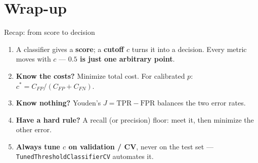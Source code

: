 \documentclass[aspectratio=169]{beamer}
\begin{document}
\section{Wrap-up}

\begin{frame}{Recap: from score to decision}
  \begin{enumerate}\small
    \item A classifier gives a \textbf{score}; a \textbf{cutoff $c$} turns it into a decision.
      Every metric moves with $c$ --- \textbf{$0.5$ is just one arbitrary point}.
    \item \textbf{Know the costs?} Minimize total cost. For calibrated $p$:
      $c^* = C_{FP}/(C_{FP}+C_{FN})$.
    \item \textbf{Know nothing?} Youden's $J = \mathrm{TPR}-\mathrm{FPR}$ balances the two error rates.
    \item \textbf{Have a hard rule?} A recall (or precision) floor: meet it, then minimize the other error.
    \item \textbf{Always tune $c$ on validation / CV}, never on the test set ---
      \texttt{TunedThresholdClassifierCV} automates it.
  \end{enumerate}
  \vfill
\end{frame}
\end{document}
